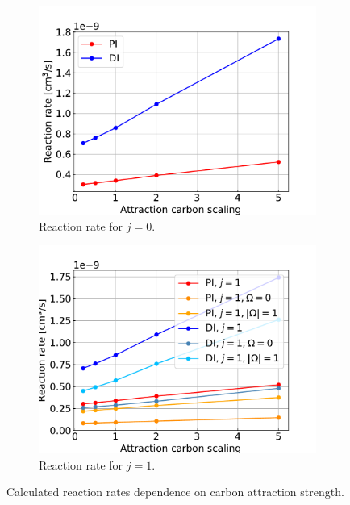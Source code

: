 \documentclass{article}
\begin{document}
    \begin{figure}[H]
        \centering
        \begin{subfigure}{.4\linewidth}
            \centering
            \includegraphics[width=\linewidth]{attr_c_scaling_ff_0.pdf}
            \caption{Reaction rate for $j = 0$.}
        \end{subfigure}
        \begin{subfigure}{.4\linewidth}
            \centering
            \includegraphics[width=\linewidth]{attr_c_scaling_ff_1.pdf}
            \caption{Reaction rate for $j = 1$.}
        \end{subfigure}     
        \caption{Calculated reaction rates dependence on carbon attraction strength.}
    \end{figure}
\end{document}

